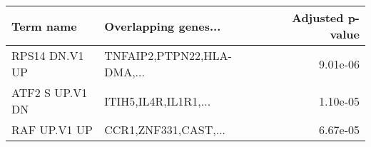 \begin{tabular}{llr}
\toprule
      Term name &       Overlapping genes... &  Adjusted p-value \\
\midrule
 RPS14 DN.V1 UP & TNFAIP2,PTPN22,HLA-DMA,... &          9.01e-06 \\
ATF2 S UP.V1 DN &       ITIH5,IL4R,IL1R1,... &          1.10e-05 \\
   RAF UP.V1 UP &       CCR1,ZNF331,CAST,... &          6.67e-05 \\
\bottomrule
\end{tabular}
